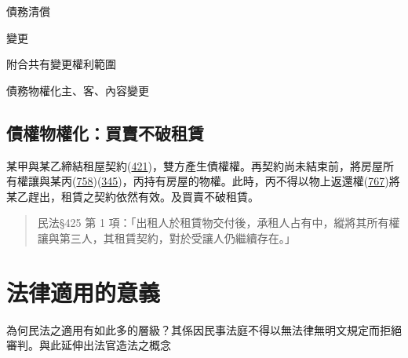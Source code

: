 \documentclass[
]{book}
\begin{document}
債務清償

變更

附合共有變更權利範圍

債務物權化主、客、內容變更

\hypertarget{ux50b5ux6b0aux7269ux6b0aux5316ux8cb7ux8ce3ux4e0dux7834ux79dfux8cc3}{%
\subsection{債權物權化：買賣不破租賃}\label{ux50b5ux6b0aux7269ux6b0aux5316ux8cb7ux8ce3ux4e0dux7834ux79dfux8cc3}}

某甲與某乙締結租屋契約(\href{https://law.moj.gov.tw/LawClass/LawSingle.aspx?pcode=B0000001\&flno=421}{421})，雙方產生債權權。再契約尚未結束前，將房屋所有權讓與某丙(\href{https://law.moj.gov.tw/LawClass/LawSingle.aspx?pcode=B0000001\&flno=758}{758})(\href{https://law.moj.gov.tw/LawClass/LawSingle.aspx?pcode=B0000001\&flno=345}{345})，丙持有房屋的物權。此時，丙不得以物上返還權(\href{https://law.moj.gov.tw/LawClass/LawSingle.aspx?pcode=B0000001\&flno=767}{767})將某乙趕出，租賃之契約依然有效。及買賣不破租賃。

\begin{quote}
民法§425 第 1 項：「出租人於租賃物交付後，承租人占有中，縱將其所有權讓與第三人，其租賃契約，對於受讓人仍繼續存在。」
\end{quote}

\hypertarget{ux6cd5ux5f8bux9069ux7528ux7684ux610fux7fa9}{%
\section{法律適用的意義}\label{ux6cd5ux5f8bux9069ux7528ux7684ux610fux7fa9}}

為何民法之適用有如此多的層級？其係因民事法庭不得以無法律無明文規定而拒絕審判。與此延伸出法官造法之概念

  
\end{document}
